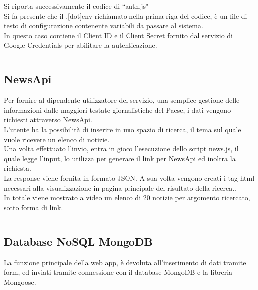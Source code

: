 \begin{flushleft}
\begin{lstlisting}
\end{lstlisting}
Si riporta successivamente il codice di “auth.js"\\
Si fa presente che il .[dot]env richiamato nella prima riga del codice, è un file di testo di configurazione contenente variabili da passare al sistema.\\
In questo caso contiene il Client ID e il Client Secret fornito dal servizio di Google Credentials per abilitare la autenticazione.\\


\begin{lstlisting}
\end{lstlisting}

\subsection{NewsApi}
Per fornire al dipendente utilizzatore del servizio, una semplice gestione delle informazioni dalle maggiori testate giornalistiche del Paese, i dati vengono richiesti attraverso NewsApi.\\
L’utente ha la possibilità di inserire in uno spazio di ricerca, il tema sul quale vuole ricevere un elenco di notizie.\\
Una volta effettuato l’invio, entra in gioco l’esecuzione dello script news.js, il quale legge l’input, lo utilizza per generare il link per NewsApi ed inoltra la richiesta.\\
La response viene fornita in formato JSON. A sua volta vengono creati i tag html necessari alla visualizzazione in pagina principale del risultato della ricerca..\\
In totale viene mostrato a video un elenco di 20 notizie per argomento ricercato, sotto forma di link.\\


\begin{lstlisting}
\end{lstlisting}

\subsection{Database NoSQL MongoDB}
La funzione principale della web app, è devoluta all’inserimento di dati tramite form, ed inviati tramite connessione con il database MongoDB e la libreria Mongoose.\\


\end{flushleft}
